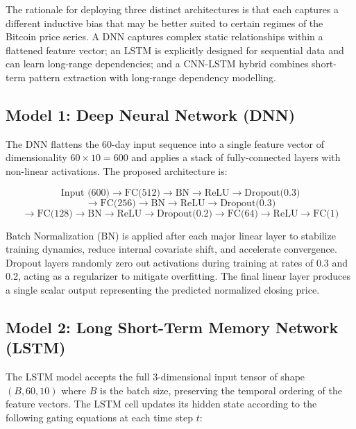 \documentclass[12pt]{article}
\begin{document}
The rationale for deploying three distinct architectures is that each captures a different inductive bias that may be better suited to certain regimes of the Bitcoin price series. A DNN captures complex static relationships within a flattened feature vector; an LSTM is explicitly designed for sequential data and can learn long-range dependencies; and a CNN-LSTM hybrid combines short-term pattern extraction with long-range dependency modelling.

\subsection{Model 1: Deep Neural Network (DNN)}

The DNN flattens the 60-day input sequence into a single feature vector of dimensionality $60 \times 10 = 600$ and applies a stack of fully-connected layers with non-linear activations. The proposed architecture is:

\begin{equation}
    \text{Input (600)} \rightarrow \text{FC(512)} \rightarrow \text{BN} \rightarrow \text{ReLU} \rightarrow \text{Dropout(0.3)}
\end{equation}
\begin{equation}
    \rightarrow \text{FC(256)} \rightarrow \text{BN} \rightarrow \text{ReLU} \rightarrow \text{Dropout(0.3)}
\end{equation}
\begin{equation}
    \rightarrow \text{FC(128)} \rightarrow \text{BN} \rightarrow \text{ReLU} \rightarrow \text{Dropout(0.2)} \rightarrow \text{FC(64)} \rightarrow \text{ReLU} \rightarrow \text{FC(1)}
\end{equation}

Batch Normalization (BN) is applied after each major linear layer to stabilize training dynamics, reduce internal covariate shift, and accelerate convergence. Dropout layers randomly zero out activations during training at rates of 0.3 and 0.2, acting as a regularizer to mitigate overfitting. The final linear layer produces a single scalar output representing the predicted normalized closing price.

\subsection{Model 2: Long Short-Term Memory Network (LSTM)}

The LSTM model accepts the full 3-dimensional input tensor of shape $(B, 60, 10)$ where $B$ is the batch size, preserving the temporal ordering of the feature vectors. The LSTM cell updates its hidden state according to the following gating equations at each time step $t$:
\end{document}
